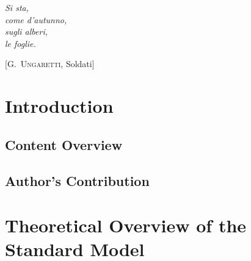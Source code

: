 \documentclass[10pt,twoside,cucitura,classica,english,openany]{toptesi}
\begin{document}

\english

\cleardoublepage

\frontespizio
\paginavuota
\begin{dedica}
\end{dedica}



\indici

\begin{citazioni}
  \textit{Si sta, \\
    come d'autunno, \\
    sugli alberi, \\
    le foglie.}

  [\textsc{G.~Ungaretti}, Soldati]
\end{citazioni}


\printglossaries

\sommario



\mainmatter

\chapter{Introduction}
\label{cha:intro}



\section{Content Overview}
\label{sec:content-overview}



\section{Author's Contribution}
\label{sec:authors-contribution}



\chapter{Theoretical Overview of the Standard Model}
\label{cha:theoretical-overview}
\end{document}
